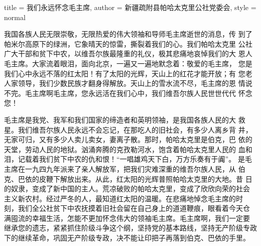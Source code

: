 \begin{hongqiarticle}{
        title  = {我们永远怀念毛主席},
        author = {新疆疏附县帕哈太克里公社党委会},
        style  = normal
    }

    我国各族人民无限崇敬，无限热爱的伟大领袖和导师毛主席逝世的消息，传
    到了帕米尔高原下的绿洲，它象晴天的惊雷，撕裂着我们的心。我们帕哈太克里
    公社广大干部和贫下中农，以维吾尔族最隆重的礼仪，极其悲痛地哀悼我们的大
    恩人毛主席。大家流着眼泪，面向北京，一遍又一遍地默念着：敬爱的毛主席，
    您是我们心中永远不落的红太阳！有了太阳的光辉，天山上的红花才能开放；有
    您老人家领导，我们少数民族才翻身得解放。天山上的雪水流不尽，毛主席的恩
    情说不完。毛主席啊毛主席，您永远活在我们心中，我们维吾尔族人民世世代代
    怀念您！

    毛主席是我党、我军和我们国家的缔造者和英明领袖，是我国各族人民的大
    救星。我们维吾尔族人民永远不会忘记，在那吃人的旧社会，有多少人离乡背
    井，无家可归，又有多少人卖儿卖女，妻离子散。那时，帕哈太克里是伯克，巴
    依的天堂，劳动人民的地狱。汹涌奔腾的克孜勒河水，饱含着帕哈太克里人民的
    血和泪，记载着我们贫下中农的仇和恨！“一唱雄鸡天下白，万方乐奏有于阗”。
    是毛主席在一九四九年派来了亲人解放军，把我们灾难深重的维吾尔族人民，从
    伯克、巴依的皮鞭下解放出来。从此，红太阳的光辉普照帕哈太克里的大地。昔
    日的奴隶，变成了新中国的主人。荒凉破败的帕哈太克里，变成了欣欣向荣的社会
    主义新农村。经过严冬的人，最知道红太阳的温暖。在悲痛地悼念毛主席的时
    刻，我们全公社贫下中农抚摸着旧社会留在自己身上的道道鞭痕，眼看着今天仓
    满囤流的幸福生活，怎能不更加怀念伟大的领袖毛主席。毛主席啊，我们一定要
    继承您的遗志，紧紧抓住阶级斗争这个纲，坚持党的基本路线，坚持无产阶级专政
    下的继续革命，巩固无产阶级专政，决不能让印把子再落到伯克、巴依的手里。


\end{hongqiarticle}
